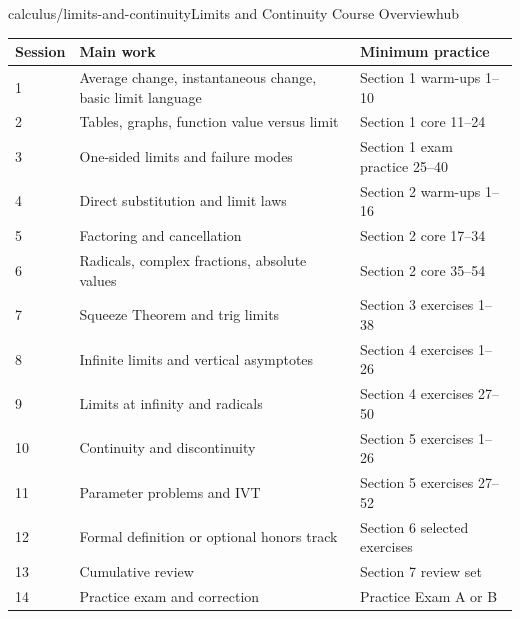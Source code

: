 \begin{webpage}{calculus/limits-and-continuity}{Limits and Continuity Course Overview}{hub}
\begin{center}
\begin{tabularx}{\textwidth}{@{}p{}X X@{}}
\toprule
\textbf{Session} & \textbf{Main work} & \textbf{Minimum practice}\\
\midrule
1 & Average change, instantaneous change, basic limit language & Section 1 warm-ups 1--10\\
2 & Tables, graphs, function value versus limit & Section 1 core 11--24\\
3 & One-sided limits and failure modes & Section 1 exam practice 25--40\\
4 & Direct substitution and limit laws & Section 2 warm-ups 1--16\\
5 & Factoring and cancellation & Section 2 core 17--34\\
6 & Radicals, complex fractions, absolute values & Section 2 core 35--54\\
7 & Squeeze Theorem and trig limits & Section 3 exercises 1--38\\
8 & Infinite limits and vertical asymptotes & Section 4 exercises 1--26\\
9 & Limits at infinity and radicals & Section 4 exercises 27--50\\
10 & Continuity and discontinuity & Section 5 exercises 1--26\\
11 & Parameter problems and IVT & Section 5 exercises 27--52\\
12 & Formal definition or optional honors track & Section 6 selected exercises\\
13 & Cumulative review & Section 7 review set\\
14 & Practice exam and correction & Practice Exam A or B\\
\bottomrule
\end{tabularx}
\end{center}
\end{webpage}

